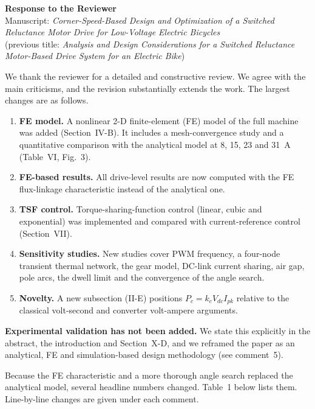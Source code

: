\documentclass[10pt]{article}
\begin{document}
\begin{center}
{\Large\bfseries Response to the Reviewer}\\[4pt]
Manuscript: \emph{Corner-Speed-Based Design and Optimization of a Switched Reluctance Motor Drive for Low-Voltage Electric Bicycles}\\
(previous title: \emph{Analysis and Design Considerations for a Switched Reluctance Motor-Based Drive System for an Electric Bike})
\end{center}

We thank the reviewer for a detailed and constructive review. We agree with
the main criticisms, and the revision substantially extends the work. The
largest changes are as follows.
\begin{enumerate}[nosep]
\item \textbf{FE model.} A nonlinear 2-D finite-element (FE) model of the full
machine was added (Section~IV-B). It includes a mesh-convergence study and a
quantitative comparison with the analytical model at 8, 15, 23 and 31~A
(Table~VI, Fig.~3).
\item \textbf{FE-based results.} All drive-level results are now computed with
the FE flux-linkage characteristic instead of the analytical one.
\item \textbf{TSF control.} Torque-sharing-function control (linear, cubic and
exponential) was implemented and compared with current-reference control
(Section~VII).
\item \textbf{Sensitivity studies.} New studies cover PWM frequency, a
four-node transient thermal network, the gear model, DC-link current sharing,
air gap, pole arcs, the dwell limit and the convergence of the angle search.
\item \textbf{Novelty.} A new subsection (II-E) positions $P_c=k_cV_{dc}I_{pk}$
relative to the classical volt-second and converter volt-ampere arguments.
\end{enumerate}
\textbf{Experimental validation has not been added.} We state this explicitly
in the abstract, the introduction and Section~X-D, and we reframed the paper as
an analytical, FE and simulation-based design methodology (see comment~5).

Because the FE characteristic and a more thorough angle search replaced the
analytical model, several headline numbers changed. Table~1 below lists them.
Line-by-line changes are given under each comment.
\end{document}
